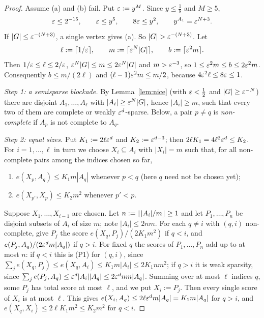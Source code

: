 \begin{proof}
Assume (a) and (b) fail. Put $\varepsilon:=y^M$. Since $y\le\frac18$ and $M\ge5$,
\[
\varepsilon\le2^{-15},\qquad\varepsilon\le y^5,\qquad8\varepsilon\le y^2,\qquad y^{A_1}=\varepsilon^{N+3}.
\]
If $|G|\le\varepsilon^{-(N+3)}$, a single vertex gives (a). So $|G|>\eps^{-(N+3)}$. Let
\[
\ell:=\lceil 1/\varepsilon\rceil,\qquad m:=\lceil \varepsilon^N|G|\rceil,\qquad b:=\lceil \varepsilon^2m\rceil.
\]
Then $1/\varepsilon\le\ell\le2/\varepsilon$, $\varepsilon^N|G|\le m\le2\varepsilon^N|G|$ and $m>\varepsilon^{-3}$, so $1\le\varepsilon^2m\le b\le2\varepsilon^2m$.
Consequently $b\le m/(2\ell)$ and $(\ell-1)\varepsilon^2m\le m/2$, because $4\varepsilon^2\ell\le8\varepsilon\le1$.

\emph{Step 1: a semisparse blockade.} By Lemma~\ref{lem:nice} (with $\varepsilon<\frac12$ and $|G|\ge\varepsilon^{-N}$)
there are disjoint $A_1,\dots,A_\ell$ with $|A_i|\ge\varepsilon^N|G|$, hence $|A_i|\ge m$, such that every two of
them are complete or weakly $\varepsilon^d$-sparse. Below, a pair $p\ne q$ is \emph{non-complete} if $A_p$ is not
complete to $A_q$.

\emph{Step 2: equal sizes.} Put $K_1:=2\ell\varepsilon^d$ and $K_2:=\varepsilon^{d-3}$; then $2\ell K_1=4\ell^2\varepsilon^d\le K_2$.
For $i=1,\dots,\ell$ in turn we choose $X_i\subseteq A_i$ with $|X_i|=m$ such that, for all non-complete pairs
among the indices chosen so far,
\begin{enumerate}[label=(P\arabic*)]
\item $e(X_p,A_q)\le K_1m|A_q|$ whenever $p<q$ (here $q$ need not be chosen yet);
\item $e(X_{p'},X_p)\le K_2m^2$ whenever $p'<p$.
\end{enumerate}
Suppose $X_1,\dots,X_{i-1}$ are chosen. Let $n:=\lfloor |A_i|/m\rfloor\ge1$ and let $P_1,\dots,P_n$ be disjoint
subsets of $A_i$ of size $m$; note $|A_i|\le2nm$. For each $q\ne i$ with $(q,i)$ non-complete, give
$P_j$ the score $e(X_q,P_j)/(2K_1m^2)$ if $q<i$, and $e(P_j,A_q)/(2\varepsilon^dm|A_q|)$ if $q>i$. For fixed $q$ the
scores of $P_1,\dots,P_n$ add up to at most $n$: if $q<i$ this is (P1) for $(q,i)$, since $\sum_je(X_q,P_j)\le
e(X_q,A_i)\le K_1m|A_i|\le2K_1nm^2$; if $q>i$ it is weak sparsity, since $\sum_je(P_j,A_q)\le
\varepsilon^d|A_i||A_q|\le2\varepsilon^dnm|A_q|$. Summing over at most $\ell$ indices $q$, some $P_j$ has total score at most
$\ell$, and we put $X_i:=P_j$. Then every single score of $X_i$ is at most $\ell$. This gives
$e(X_i,A_q)\le2\ell\varepsilon^dm|A_q|=K_1m|A_q|$ for $q>i$, and $e(X_q,X_i)\le2\ell K_1m^2\le K_2m^2$ for $q<i$.


\end{proof}
